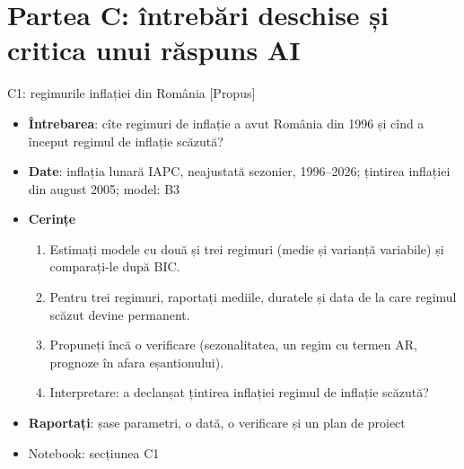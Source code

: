 \section{Partea C: întrebări deschise și critica unui răspuns AI}

\begin{frame}{C1: regimurile inflației din România [Propus]}
\itemsize{\footnotesize}
\begin{itemize}
\item \textbf{Întrebarea}: cîte regimuri de inflație a avut România din 1996 și cînd a început regimul de inflație scăzută?
\item \textbf{Date}: inflația lunară IAPC, neajustată sezonier, 1996--2026; țintirea inflației din august 2005; model: B3
\item \textbf{Cerințe}
\begin{enumerate}
    \item Estimați modele cu două și trei regimuri (medie și varianță variabile) și comparați-le după BIC.
    \item Pentru trei regimuri, raportați mediile, duratele și data de la care regimul scăzut devine permanent.
    \item Propuneți încă o verificare (sezonalitatea, un regim cu termen AR, prognoze în afara eșantionului).
    \item Interpretare: a declanșat țintirea inflației regimul de inflație scăzută?
\end{enumerate}
\item \textbf{Raportați}: șase parametri, o dată, o verificare și un plan de proiect
\item Notebook: secțiunea C1
\end{itemize}
\end{frame}

